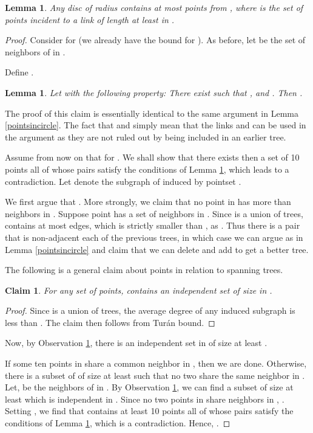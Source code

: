 \documentclass[11pt]{amsart}
\newcounter{foo}
\newtheorem{lemma}[foo]{Lemma}
\newtheorem{claim}[foo]{Claim}
\begin{document}
\begin{lemma}
Any disc of radius  contains at most  points from , where  is the set of points incident
to a link of length at least  in . 
\label{pointsincircle-kmst}
\end{lemma}
\begin{proof}
Consider  for  (we already have the bound for ). As before, let 
be the set of neighbors of  in .

Define .

\begin{lemma}
Let  with the following property:
There exist  such that ,
and .
Then .
\label{largeangle2}
\end{lemma}
The proof of this claim  is essentially identical to the same argument
in Lemma \ref{pointsincircle}.  The fact that  and
 simply mean that the links  and
 can be used in the argument as they are not ruled out by
being included in an earlier tree.

Assume from now on that  for .
We shall show that there exists then a set  of 10 points all of
whose pairs satisfy the conditions of Lemma \ref{largeangle2}, which
leads to a contradiction. 
Let  denote the subgraph of  induced by pointset .

We first argue that . More strongly,
we claim that no point in  has more than  neighbors in
. Suppose point  has a set  of 
neighbors in .  Since  is a union of  trees,  contains
at most  edges, which is strictly smaller than
, as . Thus there is a pair  that is non-adjacent each of the previous trees, in which case
we can argue as in Lemma \ref{pointsincircle} and claim that we can
delete  and add  to get a better tree.



The following is a general claim about points in relation to spanning trees.
\begin{claim}
For any set  of points,  contains
an independent set of size  in .
\label{largeis}
\end{claim}
\begin{proof}
Since  is a union of  trees, the average degree of any induced
subgraph is less than . The claim then follows from Tur\'an bound.
\end{proof}

Now, by Observation \ref{largeis},
there is an independent set  in  of size at least
.

If some ten points in  share a common neighbor in , then we
are done. Otherwise, there is a subset  of  of size at least 
 such that no two share the same neighbor in . 
Let,  be the neighbors of  in . By Observation \ref{largeis}, 
we can find a subset  of
size at least  which is independent in .
Since no two points in  share neighbors in , . Setting , we find that  contains at least 10 points all of whose
pairs satisfy the conditions of Lemma \ref{largeangle2}, which is a contradiction.
Hence, .
\end{proof}
\end{document}
